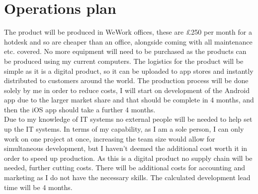 \documentclass{article}[18pt]
\begin{document}
\section{Operations plan}
The product will be produced in WeWork offices, these are £250 per month for a hotdesk and so are cheaper than an office, alongside coming with all maintenance etc. covered. No more equipment will need to be purchased as the products can be produced using my current computers. The logistics for the product will be simple as it is a digital product, so it can be uploaded to app stores and instantly distributed to customers around the world. The production process will be done solely by me in order to reduce costs, I will start on development of the Android app due to the larger market share and that should be complete in 4 months, and then the iOS app should take a further 4 months.\\
Due to my knowledge of IT systems no external people will be needed to help set up the IT systems. In terms of my capability, as I am a sole person, I can only work on one project at once, increasing the team size would allow for simultaneous development, but I haven't deemed the additional cost worth it in order to speed up production. As this is a digital product no supply chain will be needed, further cutting costs. There will be additional costs for accounting and marketing as I do not have the necessary skills. The calculated development lead time will be 4 months.
\end{document}
